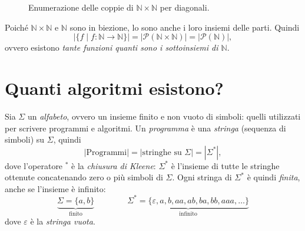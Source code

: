 \documentclass[a4paper, 11pt, oneside]{book}
\theoremstyle{formale}
\begin{document}
    \begin{figure}[H]
        \centering
        \caption{Enumerazione delle coppie di $\mathbb{N} \times \mathbb{N}$ per diagonali.}
        \label{fig:diagonali}
    \end{figure}

    Poich\'e $\mathbb{N} \times \mathbb{N}$ e $\mathbb{N}$ sono in biezione, lo sono anche i
    loro insiemi delle parti. Quindi
    \begin{equation*}
        |\{f \mid f \colon \mathbb{N} \to \mathbb{N}\}|
        = |\mathcal{P}(\mathbb{N} \times \mathbb{N})|
        = |\mathcal{P}(\mathbb{N})|,
    \end{equation*}
    ovvero esistono \emph{tante funzioni quanti sono i sottoinsiemi di $\mathbb{N}$}.

    \section{Quanti algoritmi esistono?}
    \label{sec:algoritmi}
    Sia $\Sigma$ un \emph{alfabeto}, ovvero un insieme finito e non vuoto di simboli: quelli
    utilizzati per scrivere programmi e algoritmi. Un \emph{programma} \`e una
    \emph{stringa} (sequenza di simboli) su $\Sigma$, quindi
    \begin{equation*}
        |\text{Programmi}| = |\text{stringhe su } \Sigma| = |\Sigma^*|,
    \end{equation*}
    dove l'operatore $^*$ \`e la \emph{chiusura di Kleene}: $\Sigma^*$ \`e l'insieme di
    tutte le stringhe ottenute concatenando zero o pi\`u simboli di $\Sigma$. Ogni stringa
    di $\Sigma^*$ \`e quindi \emph{finita}, anche se l'insieme \`e infinito:
    \begin{equation*}
        \underbrace{\Sigma = \{a, b\}}_{\text{finito}}
        \qquad\qquad
        \underbrace{\Sigma^* = \{\varepsilon, a, b, aa, ab, ba, bb, aaa, \dots\}}_
        {\text{infinito}}
    \end{equation*}
    dove $\varepsilon$ \`e la \emph{stringa vuota}.
\end{document}
